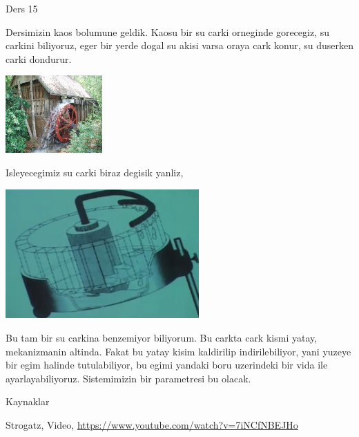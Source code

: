 \documentclass[12pt,fleqn]{article}\usepackage{../../common}
\begin{document}
Ders 15

Dersimizin kaos bolumune geldik. Kaosu bir su carki orneginde gorecegiz, su
carkini biliyoruz, eger bir yerde dogal su akisi varsa oraya cark konur, su
duserken carki dondurur.

\includegraphics[width=10em]{waterwheel.jpg}

Isleyecegimiz su carki biraz degisik yanliz, 

\includegraphics[width=20em]{15_01.jpg}

Bu tam bir su carkina benzemiyor biliyorum. Bu carkta cark kismi yatay,
mekanizmanin altinda. Fakat bu yatay kisim kaldirilip indirilebiliyor, yani
yuzeye bir egim halinde tutulabiliyor, bu egimi yandaki boru uzerindeki bir
vida ile ayarlayabiliyoruz. Sistemimizin bir parametresi bu olacak. 













Kaynaklar

Strogatz, Video, \url{https://www.youtube.com/watch?v=7iNCfNBEJHo}
\end{document}
